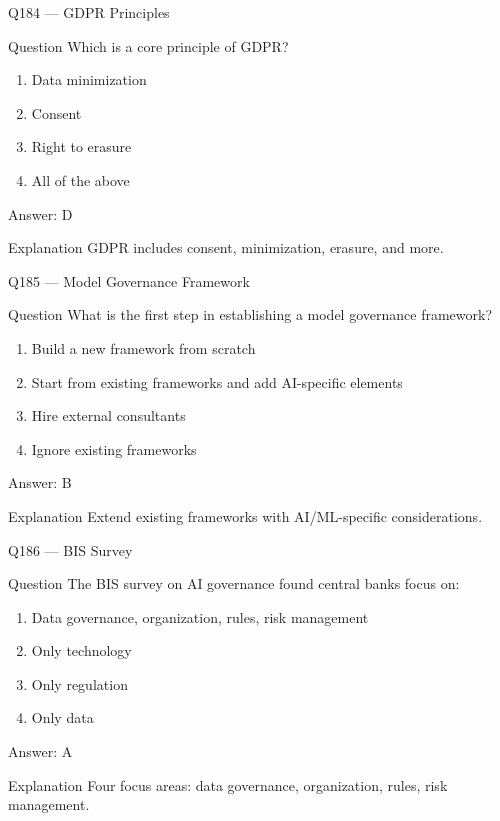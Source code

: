\documentclass[aspectratio=169,8pt]{beamer}
\begin{document}
	\begin{frame}{Q184 --- GDPR Principles}
		\begin{block}{Question}
			Which is a core principle of GDPR?
			\begin{enumerate}
				\item Data minimization
				\item Consent
				\item Right to erasure
				\item All of the above
			\end{enumerate}
		\end{block}
		\begin{exampleblock}{Answer: D}\end{exampleblock}
		\begin{block}{Explanation}
			GDPR includes consent, minimization, erasure, and more.
		\end{block}
	\end{frame}
	
	\begin{frame}{Q185 --- Model Governance Framework}
		\begin{block}{Question}
			What is the first step in establishing a model governance framework?
		\end{block}
		\begin{enumerate}
			\item Build a new framework from scratch
			\item Start from existing frameworks and add AI-specific elements
			\item Hire external consultants
			\item Ignore existing frameworks
		\end{enumerate}
		\begin{exampleblock}{Answer: B}\end{exampleblock}
		\begin{block}{Explanation}
			Extend existing frameworks with AI/ML-specific considerations.
		\end{block}
	\end{frame}
	
	\begin{frame}{Q186 --- BIS Survey}
		\begin{block}{Question}
			The BIS survey on AI governance found central banks focus on:
			\begin{enumerate}
				\item Data governance, organization, rules, risk management
				\item Only technology
				\item Only regulation
				\item Only data
			\end{enumerate}
		\end{block}
		\begin{exampleblock}{Answer: A}\end{exampleblock}
		\begin{block}{Explanation}
			Four focus areas: data governance, organization, rules, risk management.
		\end{block}
	\end{frame}
	
\end{document}
